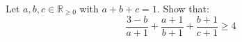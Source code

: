 Let $a,b,c \in \mathbb{R}_{\geq 0}$ with $a+b+c=1$. Show that:
$$\frac{3-b}{a+1}+\frac{a+1}{b+1}+\frac{b+1}{c+1}\geq 4$$